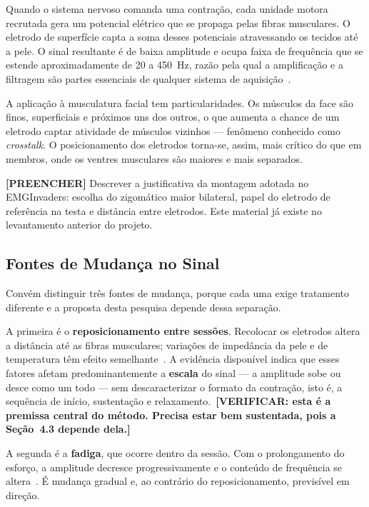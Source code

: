 Quando o sistema nervoso comanda uma contração, cada unidade motora
recrutada gera um potencial elétrico que se propaga pelas fibras
musculares. O eletrodo de superfície capta a soma desses potenciais
atravessando os tecidos até a pele. O sinal resultante é de baixa
amplitude e ocupa faixa de frequência que se estende aproximadamente de
20 a 450~Hz, razão pela qual a amplificação e a filtragem são partes
essenciais de qualquer sistema de
aquisição~\cite{ref:semg_fundamentos}.

A aplicação à musculatura facial tem particularidades. Os músculos da
face são finos, superficiais e próximos uns dos outros, o que aumenta a
chance de um eletrodo captar atividade de músculos vizinhos ---
fenômeno conhecido como \textit{crosstalk}. O posicionamento dos
eletrodos torna-se, assim, mais crítico do que em membros, onde os
ventres musculares são maiores e mais separados.

\textbf{[PREENCHER]} Descrever a justificativa da montagem adotada no
EMGInvaders: escolha do zigomático maior bilateral, papel do eletrodo
de referência na testa e distância entre eletrodos. Este material já
existe no levantamento anterior do projeto.

\subsection{Fontes de Mudança no Sinal}

Convém distinguir três fontes de mudança, porque cada uma exige
tratamento diferente e a proposta desta pesquisa depende dessa
separação.

A primeira é o \textbf{reposicionamento entre sessões}. Recolocar os
eletrodos altera a distância até as fibras musculares; variações de
impedância da pele e de temperatura têm efeito
semelhante~\cite{ref:variabilidade_intersessao}. A evidência disponível
indica que esses fatores afetam predominantemente a \textbf{escala} do
sinal --- a amplitude sobe ou desce como um todo --- sem descaracterizar
o formato da contração, isto é, a sequência de início, sustentação e
relaxamento.~\textbf{[VERIFICAR: esta é a premissa central do método.
Precisa estar bem sustentada, pois a Seção~4.3 depende dela.]}

A segunda é a \textbf{fadiga}, que ocorre dentro da sessão. Com o
prolongamento do esforço, a amplitude decresce progressivamente e o
conteúdo de frequência se altera~\cite{ref:fadiga_semg}. É mudança
gradual e, ao contrário do reposicionamento, previsível em direção.

